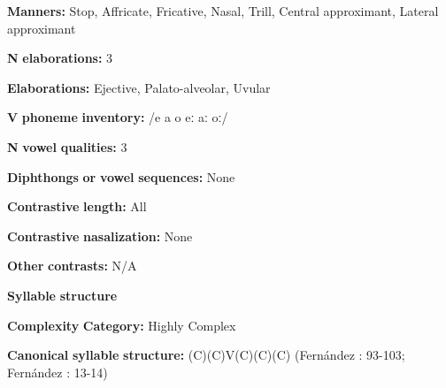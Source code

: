 \begin{styleBody}
\textbf{Manners:} Stop, Affricate, Fricative, Nasal, Trill, Central approximant, Lateral approximant
\end{styleBody}

\begin{styleBody}
\textbf{N} \textbf{elaborations:} 3
\end{styleBody}

\begin{styleBody}
\textbf{Elaborations:} Ejective, Palato-alveolar, Uvular
\end{styleBody}

\begin{styleBody}
\textbf{V} \textbf{phoneme} \textbf{inventory:} /e a o eː aː oː/
\end{styleBody}

\begin{styleBody}
\textbf{N} \textbf{vowel} \textbf{qualities:} 3
\end{styleBody}

\begin{styleBody}
\textbf{Diphthongs} \textbf{or} \textbf{vowel} \textbf{sequences:} None
\end{styleBody}

\begin{styleBody}
\textbf{Contrastive} \textbf{length:} All
\end{styleBody}

\begin{styleBody}
\textbf{Contrastive} \textbf{nasalization:} None
\end{styleBody}

\begin{styleBody}
\textbf{Other} \textbf{contrasts:} N/A
\end{styleBody}

\begin{styleBody}
\textbf{Syllable} \textbf{structure}
\end{styleBody}

\begin{styleBody}
\textbf{Complexity} \textbf{Category:} Highly Complex
\end{styleBody}

\begin{styleBody}
\textbf{Canonical} \textbf{syllable} \textbf{structure:} (C)(C)V(C)(C)(C) (Fernández \citealt{Garay1998}: 93-103; Fernández \citealt{GarayHernández2006}: 13-14)
\end{styleBody}

